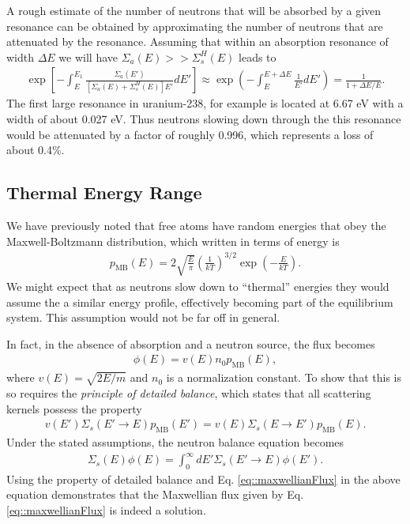 \documentclass[11pt]{article}
\begin{document}
A rough estimate of the number of neutrons that will be absorbed by a given resonance can be obtained by approximating the number of neutrons that are attenuated by the resonance.  Assuming that within an absorption resonance of width \(\Delta E\) we will have \(\Sigma_a(E) >> \Sigma_s^H(E)\) leads to
\begin{align}
  \exp\left[ -\int_E^{E_1} \frac{\Sigma_a(E')}{\left[ \Sigma_a(E) + \Sigma_s^H(E) \right] E'} dE' \right]
  \approx \exp\left( -\int_E^{E+\Delta E} \frac{1}{E'} dE' \right)
  = \frac{1}{1+\Delta E/E}.
\end{align}
The first large resonance in uranium-238, for example is located at 6.67 eV with a width of about 0.027 eV.  Thus neutrons slowing down through the this resonance would be attenuated by a factor of roughly 0.996, which represents a loss of about 0.4\%.

\subsection{Thermal Energy Range}
\label{sec:orgheadline4}
We have previously noted that free atoms have random energies that obey the Maxwell-Boltzmann distribution, which written in terms of energy is
\begin{align}
  p_\text{MB}(E) = 2 \sqrt{\frac{E}{\pi}} \left( \frac{1}{kT} \right)^{3/2} \exp\left( - \frac{E}{kT} \right).
\end{align}
We might expect that as neutrons slow down to ``thermal'' energies they would assume the a similar energy profile, effectively becoming part of the equilibrium system.  This assumption would not be far off in general.

In fact, in the absence of absorption and a neutron source, the flux becomes
\begin{align}
  \label{eq::maxwellianFlux}
  \phi(E) = v(E) n_0 p_\text{MB}(E),
\end{align}
where \(v(E) = \sqrt{2E/m}\) and \(n_0\) is a normalization constant.  To show that this is so requires the \emph{principle of detailed balance}, which states that all scattering kernels possess the property
\begin{align}
  v(E') \Sigma_s(E' \rightarrow E) p_\text{MB}(E') = v(E) \Sigma_s(E \rightarrow E') p_\text{MB}(E).
\end{align}
Under the stated assumptions, the neutron balance equation becomes
\begin{align}
  \Sigma_s(E) \phi(E) = \int_0^\infty dE' \Sigma_s(E' \rightarrow E ) \phi(E').
\end{align}
Using the property of detailed balance and Eq. \eqref{eq::maxwellianFlux} in the above equation demonstrates that the Maxwellian flux given by Eq. \eqref{eq::maxwellianFlux} is indeed a solution.
\end{document}
